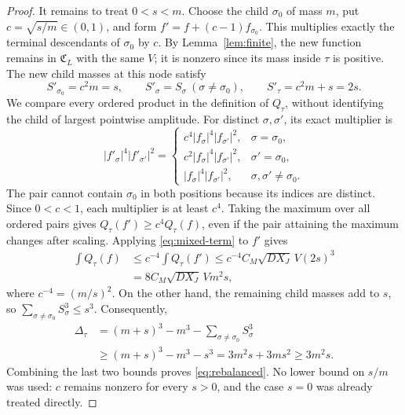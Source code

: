 \documentclass[11pt,twoside,a4paper]{article}
\numberwithin{equation}{section}
\theoremstyle{definition}
\begin{document}
\begin{proof}
It remains to treat $0<s<m$. Choose the child $\sigma_0$ of mass $m$, put $c=\sqrt{s/m}\in(0,1)$, and form $f'=f+(c-1)f_{\sigma_0}$. This multiplies exactly the terminal descendants of $\sigma_0$ by $c$. By Lemma~\ref{lem:finite}, the new function remains in $\mathfrak C_L$ with the same $V$; it is nonzero since its mass inside $\tau$ is positive. The new child masses at this node satisfy
$$
S'_{\sigma_0}=c^2m=s,\qquad
S'_\sigma=S_\sigma\ (\sigma\ne\sigma_0),\qquad
S'_\tau=c^2m+s=2s.
$$
We compare every ordered product in the definition of $Q_\tau$, without identifying the child of largest pointwise amplitude. For distinct $\sigma,\sigma'$, its exact multiplier is
$$
|f'_\sigma|^4|f'_{\sigma'}|^2
=\begin{cases}
c^4|f_\sigma|^4|f_{\sigma'}|^2,&\sigma=\sigma_0,\\
c^2|f_\sigma|^4|f_{\sigma'}|^2,&\sigma'=\sigma_0,\\
|f_\sigma|^4|f_{\sigma'}|^2,&\sigma,\sigma'\ne\sigma_0.
\end{cases}
$$
The pair cannot contain $\sigma_0$ in both positions because its indices are distinct. Since $0<c<1$, each multiplier is at least $c^4$. Taking the maximum over all ordered pairs gives $Q_\tau(f')\ge c^4Q_\tau(f)$, even if the pair attaining the maximum changes after scaling. Applying \eqref{eq:mixed-term} to $f'$ gives
$$
\begin{aligned}
\int Q_\tau(f)&\le c^{-4}\int Q_\tau(f')
\le c^{-4}C_M\sqrt{DX_J}\,V(2s)^3\\
&=8C_M\sqrt{DX_J}\,Vm^2s,
\end{aligned}
$$
where $c^{-4}=(m/s)^2$. On the other hand, the remaining child masses add to $s$, so $\sum_{\sigma\ne\sigma_0}S_\sigma^3\le s^3$. Consequently,
$$
\begin{aligned}
\Delta_\tau&=(m+s)^3-m^3-\sum_{\sigma\ne\sigma_0}S_\sigma^3\\
&\ge(m+s)^3-m^3-s^3
=3m^2s+3ms^2\ge3m^2s.
\end{aligned}
$$
Combining the last two bounds proves \eqref{eq:rebalanced}. No lower bound on $s/m$ was used: $c$ remains nonzero for every $s>0$, and the case $s=0$ was already treated directly.
\end{proof}
\end{document}
